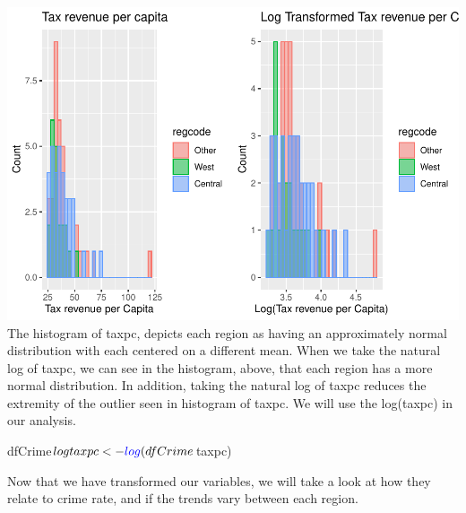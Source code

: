 \documentclass[]{article}
\newenvironment{Shaded}{}{}
\newcommand{\KeywordTok}[1]{\textcolor[rgb]{0.00,0.00,1.00}{#1}}
\newcommand{\NormalTok}[1]{#1}
\newcommand{\OperatorTok}[1]{#1}
\newcommand{\StringTok}[1]{\textcolor[rgb]{0.00,0.50,0.50}{#1}}
\begin{document}
\includegraphics{Bagnard_Gaustad_Hartman_Leung_Lab_3_files/figure-latex/unnamed-chunk-66-1.pdf}
The histogram of taxpc, depicts each region as having an approximately
normal distribution with each centered on a different mean. When we take
the natural log of taxpc, we can see in the histogram, above, that each
region has a more normal distribution. In addition, taking the natural
log of taxpc reduces the extremity of the outlier seen in histogram of
taxpc. We will use the log(taxpc) in our analysis.

\begin{Shaded}
\begin{Highlighting}[]
\NormalTok{dfCrime}\OperatorTok{$}\NormalTok{logtaxpc <-}\StringTok{ }\KeywordTok{log}\NormalTok{(dfCrime}\OperatorTok{$}\NormalTok{taxpc)}
\end{Highlighting}
\end{Shaded}

Now that we have transformed our variables, we will take a look at how
they relate to crime rate, and if the trends vary between each region.
\end{document}
